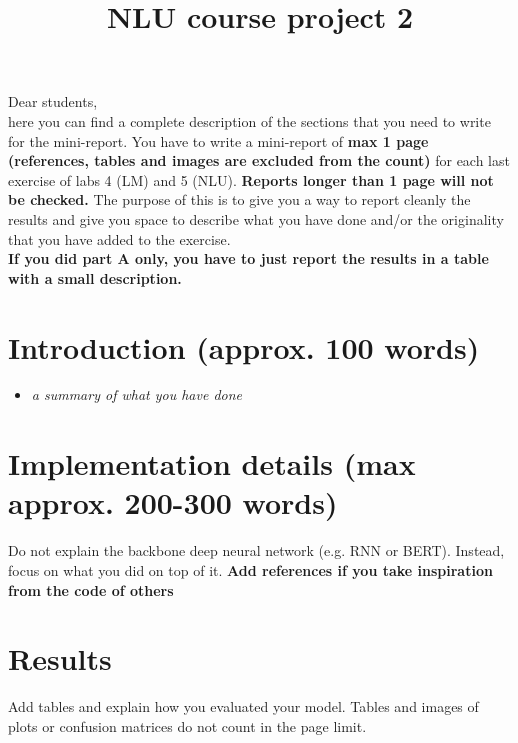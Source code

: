 \documentclass[a4paper]{article}
\title{NLU course project 2}
\begin{document}
\maketitle

Dear students, \\
here you can find a complete description of the sections that you need to write for the mini-report. You have to write a mini-report of \textbf{max 1 page (references, tables and images are excluded from the count)} for each last exercise of labs 4 (LM) and 5 (NLU). \textbf{Reports longer than 1 page will not be checked.} The purpose of this is to give you a way to report cleanly the results and give you space to describe what you have done and/or the originality that you have added to the exercise.
\\
\textbf{If you did part A only, you have to just report the results in a table with a small description.}

\section{Introduction (approx. 100 words)}
\begin{itemize}
    \item \textit{a summary of what you have done}
\end{itemize}
\section{Implementation details (max approx. 200-300 words)}
Do not explain the backbone deep neural network (e.g. RNN or BERT). Instead, focus on what you did on top of it. \textbf{Add references if you take inspiration from the code of others}

\section{Results}
Add tables and explain how you evaluated your model. Tables and images of plots or confusion matrices do not count in the page limit.





\end{document}
